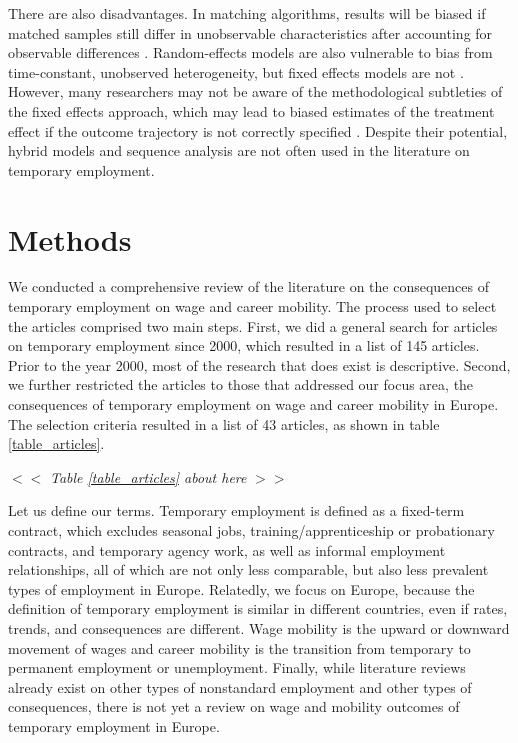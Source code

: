 \documentclass[12pt]{article}
\begin{document}
There are also disadvantages.  In matching algorithms, results will be biased if matched samples still differ in unobservable characteristics after accounting for observable differences \citep{morgan_harding_2006}.  Random-effects models are also vulnerable to bias from time-constant, unobserved heterogeneity, but fixed effects models are not \citep{halaby_2004}.  However, many researchers may not be aware of the methodological subtleties of the fixed effects approach, which may lead to biased estimates of the treatment effect if the outcome trajectory is not correctly specified \citep{ludwig_bruederl_2021}.  Despite their potential, hybrid models and sequence analysis are not often used in the literature on temporary employment.

\section{Methods}

We conducted a comprehensive review of the literature on the consequences of temporary employment on wage and career mobility.  The process used to select the articles comprised two main steps.  First, we did a general search for articles on temporary employment since 2000, which resulted in a list of 145 articles.  Prior to the year 2000, most of the research that does exist is descriptive.  Second, we further restricted the articles to those that addressed our focus area, the consequences of temporary employment on wage and career mobility in Europe.  The selection criteria resulted in a list of 43 articles, as shown in table \ref{table_articles}.

\begin{center}
$<<$ \emph{Table \ref{table_articles} about here} $>>$
\end{center}

Let us define our terms.  Temporary employment is defined as a fixed-term contract, which excludes seasonal jobs, training/apprenticeship or probationary contracts, and temporary agency work, as well as informal employment relationships, all of which are not only less comparable, but also less prevalent types of employment in Europe.  Relatedly, we focus on Europe, because the definition of temporary employment is similar in different countries, even if rates, trends, and consequences are different.  Wage mobility is the upward or downward movement of wages and career mobility is the transition from temporary to permanent employment or unemployment.  Finally, while literature reviews already exist on other types of nonstandard employment and other types of consequences, there is not yet a review on wage and mobility outcomes of temporary employment in Europe.  
\end{document}
